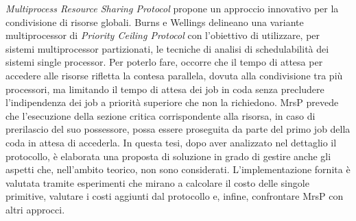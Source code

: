 \textit{Multiprocess Resource Sharing Protocol} propone un approccio innovativo per la condivisione di risorse globali. Burns e Wellings delineano una variante multiprocessor di \textit{Priority Ceiling Protocol} con l'obiettivo di utilizzare, per sistemi multiprocessor partizionati, le tecniche di analisi di schedulabilità dei sistemi single processor. Per poterlo fare, occorre che il tempo di attesa per accedere alle risorse rifletta la contesa parallela, dovuta alla condivisione tra più processori, ma limitando il tempo di attesa dei job in coda senza precludere l'indipendenza dei job a priorità superiore che non la richiedono. MrsP prevede che l'esecuzione della sezione critica corrispondente alla risorsa, in caso di prerilascio del suo possessore, possa essere proseguita da parte del primo job della coda in attesa di accederla. In questa tesi, dopo aver analizzato nel dettaglio il protocollo, è elaborata una proposta di soluzione in grado di gestire anche gli aspetti che, nell'ambito teorico, non sono considerati. L'implementazione fornita è valutata tramite esperimenti che mirano a calcolare il costo delle singole primitive, valutare i costi aggiunti dal protocollo e, infine, confrontare MrsP con altri approcci.